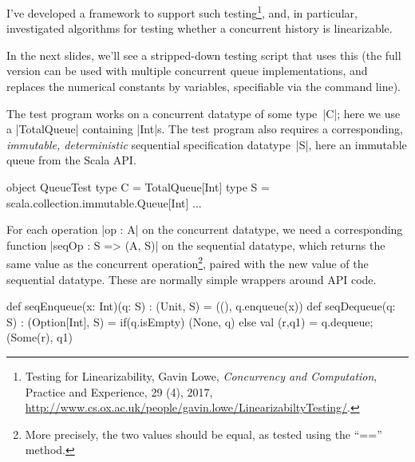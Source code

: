 
\begin{slide}

I've developed a framework to support such testing\footnote{{Testing
    for Linearizability}, Gavin Lowe, \textit{Concurrency and Computation},
    Practice and Experience, 29 (4), 2017,
  \url{http://www.cs.ox.ac.uk/people/gavin.lowe/LinearizabiltyTesting/}.},
and, in particular, investigated algorithms for testing whether a concurrent
history is linearizable.

In the next slides, we'll see a stripped-down testing script that uses this
(the full version can be used with multiple concurrent queue implementations,
and replaces the numerical constants by variables, specifiable via the command
line).

\vfill
\end{slide}


\begin{slide}

The test program works on a concurrent datatype of some type~|C|; here we use
a |TotalQueue| containing |Int|s.  The test program
also requires a corresponding, \emph{immutable, deterministic}
sequential specification datatype~|S|, here an immutable queue from the Scala
API.
%
\begin{scala}
object QueueTest{
  type C = TotalQueue[Int]
  type S = scala.collection.immutable.Queue[Int]
  ...
}
\end{scala}
\end{slide}


\begin{slide}

For each operation |op : A| on the concurrent datatype, we need a
corresponding function |seqOp : S => (A, S)| on the sequential datatype, which
returns the same value as the concurrent operation\footnote{More precisely,
  the two values should be equal, as tested using the ``{\scalashape ==}''
  method.}, paired with the new value of the sequential datatype.  These are
normally simple wrappers around API code.
%
\begin{scala}
  def seqEnqueue(x: Int)(q: S) : (Unit, S) = ((), q.enqueue(x))
  def seqDequeue(q: S) : (Option[Int], S) =   
    if(q.isEmpty) (None, q) 
    else{ val (r,q1) = q.dequeue; (Some(r), q1) }
\end{scala}
\vfill
\end{slide}


